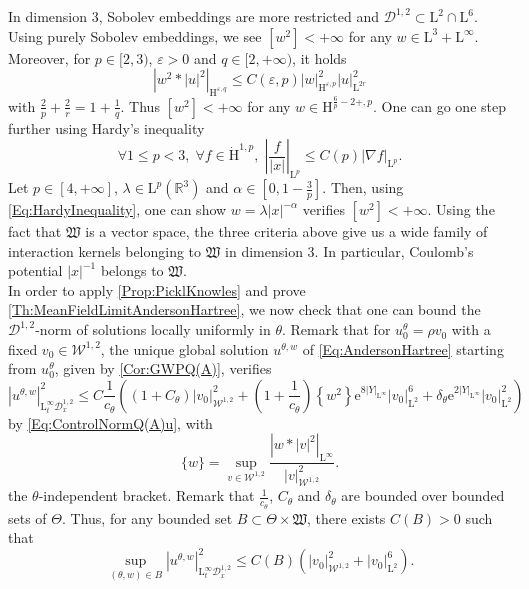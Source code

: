 \documentclass{article}
\def\W{\mathcal W}
\def\R{\mathbb R}
\def\L{\mathrm L}
\def\H{\mathrm H}
\def\eps{\varepsilon}
\theoremstyle{definition}
\numberwithin{equation}{section}
\newcommand{\e}{\mathrm{e}} %
\begin{document}
In dimension 3, Sobolev embeddings are more restricted and $\mathcal{D}^{1,2}\subset\L^2\cap\L^6$. Using purely Sobolev embeddings, we see $\left[w^2\right]<+\infty$ for any $w\in\L^3+\L^\infty$. Moreover, for $p\in[2,3)$, $\eps>0$ and $q\in[2,+\infty)$, it holds
$$\left|w^2*|u|^2\right|_{\H^{\eps,q}} \leqslant C(\eps,p)|w|_{\H^{\eps,p}}^2|u|_{\L^{2r}}^{2}$$
with $\frac{2}{p}+\frac{2}{r}=1+\frac{1}{q}$. Thus $\left[w^2\right]<+\infty$ for any $w\in\H^{\frac{6}{p}-2+,p}$. One can go one step further using Hardy's inequality
\begin{equation}\label{Eq:HardyInequality}
    \forall 1\leqslant p<3,\; \forall f\in\Dot{\H}^{1,p},\; \left|\frac{f}{|x|}\right|_{\L^p}\leqslant C(p)|\nabla f|_{\L^p}.
\end{equation}
Let $p\in[4,+\infty]$, $\lambda\in\L^p(\R^3)$ and $\alpha\in[0,1-\frac{3}{p}]$. Then, using \cref{Eq:HardyInequality}, one can show $w=\lambda|x|^{-\alpha}$ verifies $\left[w^2\right]<+\infty$. Using the fact that $\mathfrak{W}$ is a vector space, the three criteria above give us a wide family of interaction kernels belonging to $\mathfrak{W}$ in dimension 3. In particular, Coulomb's potential $|x|^{-1}$ belongs to $\mathfrak{W}$.\\

In order to apply \cref{Prop:PicklKnowles} and prove \cref{Th:MeanFieldLimitAndersonHartree}, we now check that one can bound the $\mathcal{D}^{1,2}$-norm of solutions locally uniformly in $\theta$. Remark that for $u_0^\theta=\rho v_0$ with a fixed $v_0\in\W^{1,2}$, the unique global solution $u^{\theta,w}$ of \cref{Eq:AndersonHartree} starting from $u_0^\theta$, given by \cref{Cor:GWPQ(A)}, verifies
$$\left|u^{\theta,w}\right|_{\L^\infty_t\mathcal{D}^{1,2}_x}^2\leqslant C\frac{1}{c_\theta}\left((1+C_\theta)|v_0|_{\W^{1,2}}^2 + \left(1+\frac{1}{c_\theta}\right) \left\{w^2\right\}\e^{8|Y|_{\L^\infty}}|v_0|_{\L^2}^6+\delta_\theta\e^{2|Y|_{\L^\infty}}|v_0|_{\L^2}^2\right)$$
by \cref{Eq:ControlNormQ(A)u}, with 
$$\{w\}=\sup_{v\in\W^{1,2}}\frac{\left|w*|v|^2\right|_{\L^\infty}}{|v|_{\W^{1,2}}^2}.$$
the $\theta$-independent bracket. Remark that $\frac{1}{c_\theta}$, $C_\theta$ and $\delta_\theta$ are bounded over bounded sets of $\Theta$. Thus, for any bounded set $B\subset\Theta\times\mathfrak{W}$, there exists $C(B)>0$ such that
\begin{equation}\label{Eq:ControlNormD12theta}
    \sup_{(\theta,w)\in B}\left|u^{\theta,w}\right|_{\L^\infty_t\mathcal{D}^{1,2}_x}^2\leqslant C(B)\left(|v_0|_{\W^{1,2}}^2+|v_0|_{\L^2}^6\right).
\end{equation}
\end{document}
